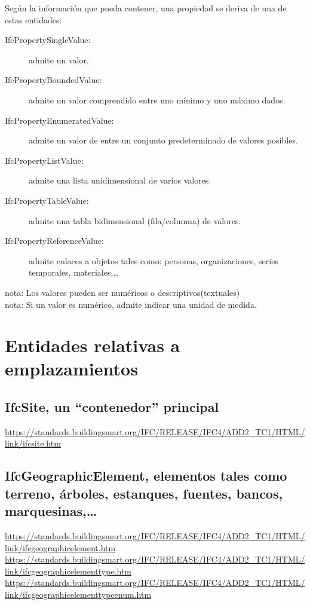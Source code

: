 \documentclass[spanish,12pt,a4paper,final,oneside]{book}
\begin{document}
Según la información que pueda contener, una propiedad se deriva de una de estas entidades:
\begin{description}
\item[IfcPropertySingleValue:] admite un valor.
\item[IfcPropertyBoundedValue:] admite un valor comprendido entre uno mínimo y uno máximo dados.
\item[IfcPropertyEnumeratedValue:] admite un valor de entre un conjunto predeterminado de valores posibles.
\item[IfcPropertyListValue:] admite una lista unidimensional de varios valores.
\item[IfcPropertyTableValue:] admite una tabla bidimensional (fila/columna) de valores.
\item[IfcPropertyReferenceValue:] admite enlaces a objetos tales como: personas, organizaciones, series temporales, materiales,\ldots
\end{description}
nota: Los valores pueden ser numéricos o descriptivos(textuales)
\\nota: Si un valor es numérico, admite indicar una unidad de medida.




\chapter{Entidades relativas a emplazamientos}

\section{IfcSite, un ``contenedor'' principal}
\url{https://standards.buildingsmart.org/IFC/RELEASE/IFC4/ADD2_TC1/HTML/link/ifcsite.htm}


\section{IfcGeographicElement, elementos tales como terreno, árboles, estanques, fuentes, bancos, marquesinas,\ldots }

\url{https://standards.buildingsmart.org/IFC/RELEASE/IFC4/ADD2_TC1/HTML/link/ifcgeographicelement.htm}
\\ \url{https://standards.buildingsmart.org/IFC/RELEASE/IFC4/ADD2_TC1/HTML/link/ifcgeographicelementtype.htm}
\\ \url{https://standards.buildingsmart.org/IFC/RELEASE/IFC4/ADD2_TC1/HTML/link/ifcgeographicelementtypeenum.htm}
\end{document}
